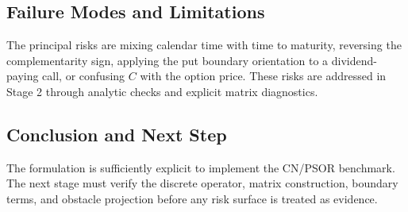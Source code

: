\documentclass[11pt]{article}
\begin{document}


\subsection{Failure Modes and Limitations}
The principal risks are mixing calendar time with time to maturity, reversing
the complementarity sign, applying the put boundary orientation to a
dividend-paying call, or confusing \(C\) with the option price. These risks are
addressed in Stage 2 through analytic checks and explicit matrix diagnostics.

\subsection{Conclusion and Next Step}
The formulation is sufficiently explicit to implement the CN/PSOR benchmark.
The next stage must verify the discrete operator, matrix construction, boundary
terms, and obstacle projection before any risk surface is treated as evidence.
\end{document}
